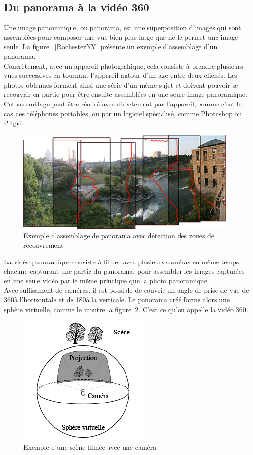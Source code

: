 \subsection{Du panorama à la vidéo 360}
Une image panoramique, ou panorama, est une superposition d'images qui sont assemblées
pour composer une vue bien plus large que ne le permet une image seule. La figure~ 
\ref{RochesterNY} présente un exemple d'assemblage d'un panorama.\\
Concrètement, avec un appareil photograhique, cela consiste à prendre plusieurs vues
successives en tournant l'appareil autour d'un axe entre deux clichés. 
Les photos obtenues forment ainsi une série d'un même sujet et doivent pouvoir 
se recouvrir en partie pour être ensuite assemblées en une seule image panoramique. 
Cet assemblage peut être réalisé avec directement par l'appareil, comme c'est le cas des 
téléphones portables, ou par un logiciel spécialisé, comme Photoshop\cite{photomerge} 
ou PTgui\cite{PTgui}.
\begin{figure}
  \centering
  \includegraphics[width=11cm]{images/rochester-ny.png}
  \caption{Exemple d'assemblage de panorama avec détection des zones de recouvrement\cite{RochesterNY}}
  \label{rochester-ny}
\end{figure}
\newline
La vidéo panoramique consiste à filmer avec plusieurs caméras en même temps, chacune
capturant une partie du panorama, pour assembler les images capturées en une seule
vidéo par le même princique que la photo panoramique.\\
Avec suffisament de caméras, il est possible de couvrir un angle de prise de vue 
de 360\degree à l'horizontale et de 180\degree à la verticale. Le panorama créé
forme alors une sphère virtuelle, comme le montre la figure~\ref{camera-projection}. 
C'est ce qu'on appelle la vidéo 360.
\begin{figure}
  \centering
  \includegraphics[width=6.5cm]{images/camera-projection.png}
  \caption{Exemple d'une scène filmée avec une caméra}
  \label{camera-projection}
\end{figure}
